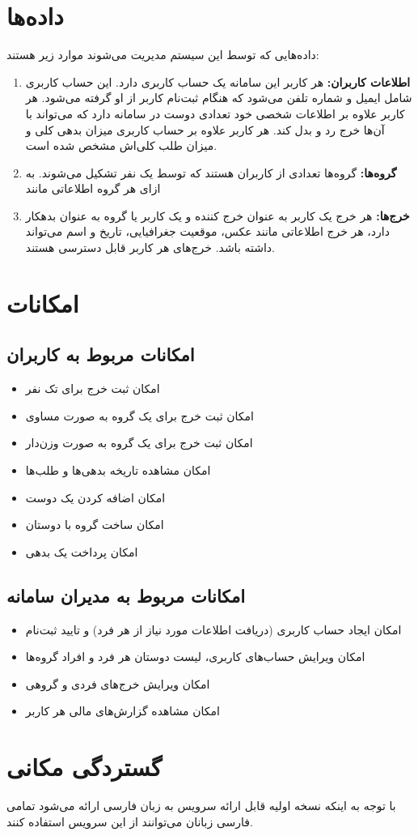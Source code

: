 \section{داده‌ها}
داده‌هایی که توسط این سیستم مدیریت می‌شوند موارد زیر هستند:
\begin{enumerate}
\item \textbf{اطلاعات کاربران:}
هر کاربر این سامانه یک حساب کاربری دارد. این حساب کاربری شامل ایمیل و شماره تلفن می‌شود که هنگام ثبت‌نام کاربر از او گرفته می‌شود. هر کاربر علاوه بر اطلاعات شخصی خود تعدادی دوست در سامانه دارد که می‌تواند با آن‌ها خرج رد و بدل کند. هر کاربر علاوه بر حساب کاربری میزان بدهی کلی و میزان طلب کلی‌ا‌ش مشخص شده است.
\item \textbf{گروه‌ها:}
گروه‌ها تعدادی از کاربران هستند که توسط یک نفر تشکیل می‌شوند. به ازای هر گروه اطلاعاتی مانند 
\item \textbf{خرج‌ها:}
هر خرج یک کاربر به عنوان خرج کننده و یک کاربر یا گروه به عنوان بدهکار دارد، هر خرج اطلاعاتی مانند عکس، موقعیت جغرافیایی، تاریخ و اسم می‌تواند داشته باشد. خرج‌های هر کاربر قابل دسترسی هستند.
\end{enumerate}

\section{امکانات}
\subsection{
امکانات مربوط به کاربران} 
\begin{itemize}
	\item
	امکان ثبت خرج برای تک نفر
	\item
	امکان ثبت خرج برای یک گروه به صورت مساوی
	\item
	امکان ثبت خرج برای یک گروه به صورت وزن‌دار
	\item
	امکان مشاهده تاریخه بدهی‌ها و طلب‌ها
	 \item
	امکان اضافه کردن یک دوست 
		 \item
	امکان ساخت گروه با دوستان
		 \item
	امکان پرداخت یک بدهی 
\end{itemize}
\subsection{
امکانات مربوط به مدیران سامانه}
\begin{itemize}
	\item 
امکان ایجاد حساب کاربری (دریافت اطلاعات مورد نیاز از هر فرد) و تایید ثبت‌نام 
\item 
امکان ویرایش حساب‌های کاربری، لیست دوستان هر فرد و افراد گروه‌ها
 \item 
امکان ویرایش خرج‌های فردی و گروهی
\item
امکان مشاهده گزارش‌های مالی هر کاربر
\end{itemize}

\section{گستردگی مکانی}
با توجه به اینکه نسخه اولیه قابل ارائه سرویس به زبان فارسی ارائه می‌شود تمامی فارسی زبانان می‌توانند از این سرویس استفاده کنند.
